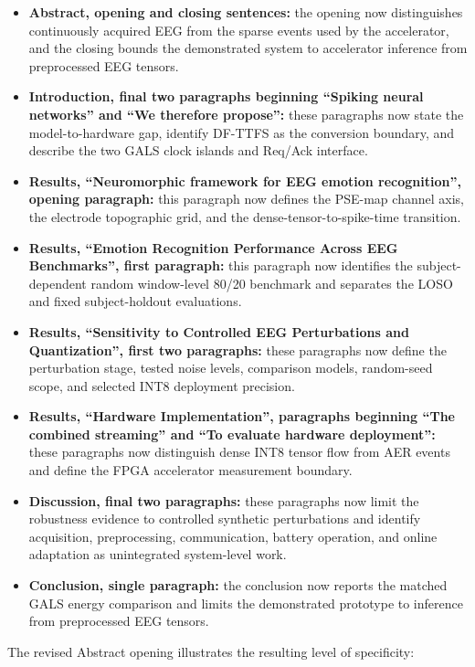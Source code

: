 \documentclass[12pt,technote,onecolumn]{IEEEtran}
\begin{document}
\begin{itemize}
\item \textbf{Abstract, opening and closing sentences:} the opening now distinguishes continuously acquired EEG from the sparse events used by the accelerator, and the closing bounds the demonstrated system to accelerator inference from preprocessed EEG tensors.
\item \textbf{Introduction, final two paragraphs beginning ``Spiking neural networks'' and ``We therefore propose'':} these paragraphs now state the model-to-hardware gap, identify DF-TTFS as the conversion boundary, and describe the two GALS clock islands and Req/Ack interface.
\item \textbf{Results, ``Neuromorphic framework for EEG emotion recognition'', opening paragraph:} this paragraph now defines the PSE-map channel axis, the electrode topographic grid, and the dense-tensor-to-spike-time transition.
\item \textbf{Results, ``Emotion Recognition Performance Across EEG Benchmarks'', first paragraph:} this paragraph now identifies the subject-dependent random window-level 80/20 benchmark and separates the LOSO and fixed subject-holdout evaluations.
\item \textbf{Results, ``Sensitivity to Controlled EEG Perturbations and Quantization'', first two paragraphs:} these paragraphs now define the perturbation stage, tested noise levels, comparison models, random-seed scope, and selected INT8 deployment precision.
\item \textbf{Results, ``Hardware Implementation'', paragraphs beginning ``The combined streaming'' and ``To evaluate hardware deployment'':} these paragraphs now distinguish dense INT8 tensor flow from AER events and define the FPGA accelerator measurement boundary.
\item \textbf{Discussion, final two paragraphs:} these paragraphs now limit the robustness evidence to controlled synthetic perturbations and identify acquisition, preprocessing, communication, battery operation, and online adaptation as unintegrated system-level work.
\item \textbf{Conclusion, single paragraph:} the conclusion now reports the matched GALS energy comparison and limits the demonstrated prototype to inference from preprocessed EEG tensors.
\end{itemize}

The revised Abstract opening illustrates the resulting level of specificity:
\end{document}
